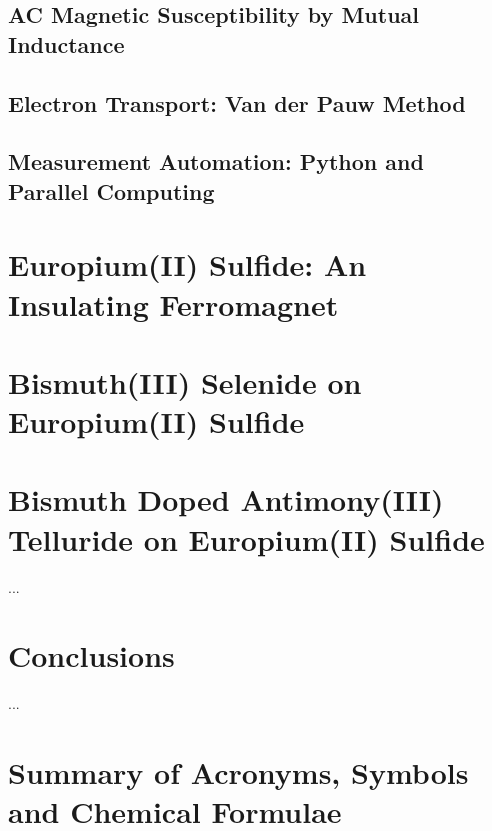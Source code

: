 \documentclass{report}
\begin{document}
    \section{AC Magnetic Susceptibility by Mutual Inductance}
    \section{Electron Transport: Van der Pauw Method}
    \section{Measurement Automation: Python and Parallel Computing}

\chapter{Europium(II) Sulfide: An Insulating Ferromagnet}
\label{ch:EuS}

\chapter{Bismuth(III) Selenide on Europium(II) Sulfide}
\label{ch:bilayer2014}


\chapter{Bismuth Doped Antimony(III) Telluride on Europium(II) Sulfide}
\label{ch:bilayer2018}
...

\chapter{Conclusions}
\label{ch:conclusions}
     ...
\appendix
\chapter{Summary of Acronyms, Symbols and Chemical Formulae}
    

\printbibliography
\end{document}
